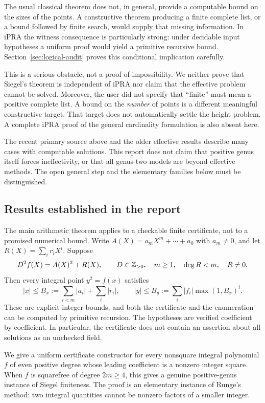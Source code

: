 The usual classical theorem does not, in general, provide a computable bound
on the sizes of the points. A constructive theorem producing a finite
complete list, or a bound followed by finite search, would supply that
missing information. In iPRA the witness consequence is particularly
strong: under decidable input hypotheses a uniform proof would yield a
primitive recursive bound. Section~\ref{sec:logical-audit} proves this
conditional implication carefully.

This is a serious obstacle, not a proof of impossibility. We neither prove
that Siegel's theorem is independent of iPRA nor claim that the effective
problem cannot be solved. Moreover, the user did not specify that
``finite'' must mean a positive complete list. A bound on the \emph{number}
of points is a different meaningful constructive target. That target does
not automatically settle the height problem. A complete iPRA proof of the
general cardinality formulation is also absent here.

The recent primary source above and the older effective results describe
many cases with computable solutions. This report does not claim that
positive genus itself forces ineffectivity, or that all genus-two models
are beyond effective methods. The open general step and the elementary
families below must be distinguished.

\subsection{Results established in the report}

The main arithmetic theorem applies to a checkable finite certificate,
not to a promised numerical bound. Write $A(X)=a_mX^m+\cdots+a_0$ with
$a_m\ne0$, and let $R(X)=\sum_i r_iX^i$. Suppose
\[
 D^2f(X)=A(X)^2+R(X),\qquad
 D\in\mathbb Z_{>0},\quad m\ge1,\quad\deg R<m,\quad R\ne0.
\]
Then every integral point $y^2=f(x)$ satisfies
\[
 |x|\le B_x:=\sum_{i<m}|a_i|+\sum_i|r_i|,
 \qquad
 |y|\le B_y:=\sum_i |f_i|\max(1,B_x)^i.
\]
These are explicit integer bounds, and both the certificate and the
enumeration can be computed by primitive recursion. The hypotheses are
verified coefficient by coefficient. In particular, the certificate
does not contain an assertion about all solutions as an unchecked field.

We give a uniform certificate constructor for every nonsquare integral
polynomial $f$ of even positive degree whose leading coefficient is a
nonzero integer square. When $f$ is squarefree of degree $2m\ge4$, this
gives a genuine positive-genus instance of Siegel finiteness. The proof
is an elementary instance of Runge's method: two integral quantities
cannot be nonzero factors of a smaller integer.

